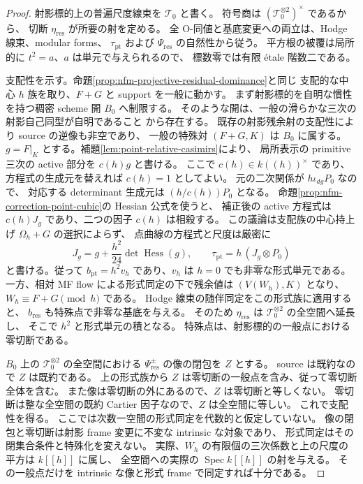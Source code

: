\begin{proof}
射影標的上の普遍尺度線束を $\mathscr T_0$ と書く。
符号商は $(\mathscr T_0^{\otimes2})^\times$ であるから、
切断 $\eta_{\mathrm{res}}$ が所要の射を定める。
全 O-同値と基底変更への両立は、Hodge 線束、modular forms、
$\tau_{\mathrm{pt}}$ および $\Psi_{\mathrm{res}}$ の自然性から従う。
平方根の被覆は局所的に $t^2=a$、$a$ は単元で与えられるので、
標数零では有限 \'etale 階数二である。

支配性を示す。命題\ref{prop:nfm-projective-residual-dominance}と同じ
支配的な中心 $h$ 族を取り、$F+G$ と support を一般に動かす。
まず射影標的を自明な慣性を持つ稠密 scheme 開 $B_0$ へ制限する。
そのような開は、一般の滑らかな三次の射影自己同型が自明であること
\cite[Theorem~1.5 and the preceding paragraph]{NFMPoonenAutomorphisms}から存在する。
既存の射影残余射の支配性により source の逆像も非空であり、
一般の特殊対 $(F+G,K)$ は $B_0$ に属する。
$g=F|_K$ とする。補題\ref{lem:point-relative-casimirs}により、
局所表示の primitive 三次の active 部分を $c(h)g$ と書ける。
ここで $c(h)\in k((h))^\times$ であり、方程式の生成元を替えれば $c(h)=1$ としてよい。
元の二次関係が $h\iota_{dg}P_0$ なので、
対応する determinant 生成元は $(h/c(h))P_0$ となる。
命題\ref{prop:nfm-correction-point-cubic}の Hessian 公式を使うと、
補正後の active 方程式は $c(h)J_g$ であり、二つの因子 $c(h)$ は相殺する。
この議論は支配族の中心持上げ $\Omega_h+G$ の選択によらず、
点曲線の方程式と尺度は厳密に
\[
 J_g=g+\frac{h^2}{24}\det\operatorname{Hess}(g),\qquad
 \tau_{\mathrm{pt}}=h\,(J_g\otimes P_0)
\]
と書ける。従って $b_{\mathrm{pt}}=h^2v_h$ であり、$v_h$ は
$h=0$ でも非零な形式単元である。
一方、相対 MF flow による形式同定の下で残余値は
$(V(W_h),K)$ となり、$W_h\equiv F+G\pmod h$ である。
Hodge 線束の随伴同定をこの形式族に適用すると、
$b_{\mathrm{res}}$ も特殊点で非零な基底を与える。
そのため $\eta_{\mathrm{res}}$ は $\mathscr T_0^{\otimes2}$ の全空間へ延長し、
そこで $h^2$ と形式単元の積となる。
特殊点は、射影標的の一般点における零切断である。

$B_0$ 上の $\mathscr T_0^{\otimes2}$ の全空間における
$\Psi_{\mathrm{res}}^{\pm}$ の像の閉包を $Z$ とする。
source は既約なので $Z$ は既約である。
上の形式族から $Z$ は零切断の一般点を含み、従って零切断全体を含む。
また像は零切断の外にあるので、$Z$ は零切断と等しくない。
零切断は整な全空間の既約 Cartier 因子なので、$Z$ は全空間に等しい。
これで支配性を得る。
ここでは次数一空間の形式同定を代数的と仮定していない。
像の閉包と零切断は射影 frame 変更に不変な intrinsic な対象であり、
形式同定はその閉集合条件と特殊化を変えない。
実際、$W_h$ の有限個の三次係数と上の尺度の平方は $k[[h]]$ に属し、
全空間への実際の $\operatorname{Spec}k[[h]]$ の射を与える。
その一般点だけを intrinsic な像と形式 frame で同定すれば十分である。


\end{proof}
